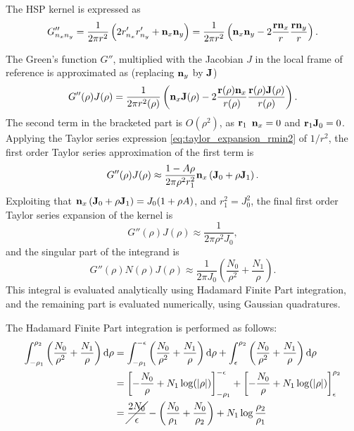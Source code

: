 The HSP kernel is expressed as
%
\begin{equation}
	G''_{n_x n_y} = \frac{1}{2\pi r^2} \left( 2 r'_{n_x} r'_{n_y} + {\bf n}_x {\bf n}_y \right)
	= \frac{1}{2\pi r^2} \left( {\bf n}_x {\bf n}_y - 2 \frac{{\bf r} {\bf n}_x}{r} \frac{{\bf r}{\bf n}_y}{r} \right)
	.
\end{equation}
%

The Green's function $G''$, multiplied with the Jacobian $J$ in the local frame of reference is approximated as (replacing ${\bf n}_y$ by ${\bf J}$)
%
\begin{equation}
	G''(\rho) J(\rho)
	= \frac{1}{2\pi r^2(\rho)} \left( {\bf n}_x {\bf J}(\rho) - 2 \frac{{\bf r}(\rho) {\bf n}_x}{r(\rho)} \frac{{\bf r}(\rho) {\bf J}(\rho)}{r(\rho)}\right)
	.
\end{equation}
%
The second term in the bracketed part is $O(\rho^2)$, as ${\bf r}_1$ ${\bf n}_x = 0$ and ${\bf r}_1 {\bf J}_0 = 0$.
Applying the Taylor series expression \eqref{eq:taylor_expansion_rmin2} of $1/r^2$, the first order Taylor series approximation of the first term is
%
\begin{equation}
	G''(\rho) J(\rho) \approx \frac{1 - A \rho}{2\pi \rho^2 r_1^2} {\bf n}_x \left({\bf J}_0 + \rho {\bf J}_1\right) 
	.
\end{equation}
%
Exploiting that ${\bf n}_x \left({\bf J}_0 + \rho {\bf J}_1\right) = J_0 (1 + \rho A)$, and $r_1^2 = J_0^2$, the final first order Taylor series expansion of the kernel is
%
\begin{equation}
	G''(\rho) J(\rho) \approx \frac{1}{2\pi \rho^2 J_0}
	,
\end{equation}
%
and the singular part of the integrand is
%
\begin{equation}
	G''(\rho) N(\rho) J(\rho) \approx \frac{1}{2\pi J_0} \left( \frac{N_0}{\rho^2} +  \frac{N_1}{\rho} \right)
	.
\end{equation}
%
This integral is evaluated analytically using Hadamard Finite Part integration, and the remaining part is evaluated numerically, using Gaussian quadratures.

The Hadamard Finite Part integration is performed as follows:
%
\begin{align}
	\int_{-\rho_1}^{\rho_2} \left( \frac{N_0}{\rho^2} +  \frac{N_1}{\rho} \right) \mathrm{d} \rho
	&= \int_{-\rho_1}^{-\epsilon} \left( \frac{N_0}{\rho^2} +  \frac{N_1}{\rho} \right) \mathrm{d} \rho
	+ \int_{\epsilon}^{\rho_2} \left( \frac{N_0}{\rho^2} +  \frac{N_1}{\rho} \right) \mathrm{d} \rho \\
	&= \left[ -\frac{N_0}{\rho} +  N_1\log(|\rho|) \right]_{-\rho_1}^{-\epsilon} +
	\left[ -\frac{N_0}{\rho} +  N_1\log(|\rho|) \right]_{\epsilon}^{\rho_2} \\
	&=  \cancel{\frac{2 N_0}{\epsilon} }
	- \left( \frac{N_0}{\rho_1} + \frac{N_0}{\rho_2} \right)
	+  N_1\log \frac{\rho_2}{\rho_1} 
\end{align}


